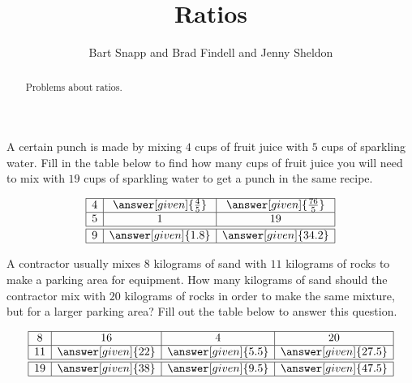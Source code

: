 \documentclass[nooutcomes]{ximera}
\title{Ratios}
\author{Bart Snapp and Brad Findell and Jenny Sheldon}
\begin{document}
\begin{abstract}
Problems about ratios.
\end{abstract}
\maketitle








\begin{problem}
A certain punch is made by mixing $4$ cups of fruit juice with $5$ cups of sparkling water.  Fill in the table below to find how many cups of fruit juice you will need to mix with $19$ cups of sparkling water to get a punch in the same recipe.

\[
\begin{array}{|c|c|c|} \hline
4 & \answer[given]{\frac{4}{5}} & \answer[given]{\frac{76}{5}} \\ \hline
5 & 1 & 19 \\ \hline \hline
9 & \answer[given]{1.8} & \answer[given]{34.2} \\ \hline
\end{array}
\]
\end{problem}


\begin{problem}
A contractor usually mixes $8$ kilograms of sand with $11$ kilograms of rocks to make a parking area for equipment.  How many kilograms of sand should the contractor mix with $20$ kilograms of rocks in order to make the same mixture, but for a larger parking area?  Fill out the table below to answer this question.

\[
\begin{array}{|c|c|c|c|} \hline
8 & 16 & 4 & 20 \\ \hline
11 & \answer[given]{22} & \answer[given]{5.5} & \answer[given]{27.5} \\ \hline \hline
19 & \answer[given]{38} & \answer[given]{9.5} & \answer[given]{47.5} \\ \hline
\end{array}
\]
\end{problem}
\end{document}
